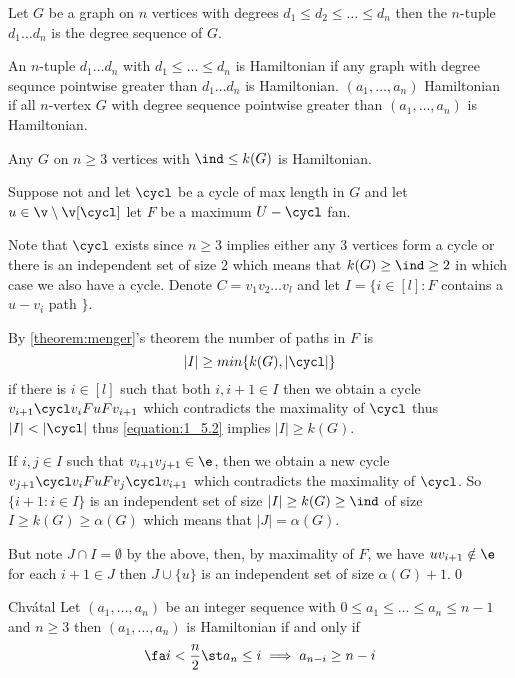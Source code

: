\begin{definition}
    Let $G$ be a graph on $n$ vertices with degrees $d_1 \leq d_2 \leq \dots \leq d_n$ then the $n$-tuple $d_1 \dots d_n$ is the degree sequence of $G$.
\end{definition}
An $n$-tuple $d_1 \dots d_n$ with $d_1 \leq \dots \leq d_n$ is Hamiltonian if any graph with degree sequnce pointwise greater than $d_1 \dots d_n$ is Hamiltonian. $(a_1, \dots, a_n)$ Hamiltonian if all $n$-vertex $G$ with degree sequence pointwise greater than $(a_1, \dots, a_n)$ is Hamiltonian.
\begin{customproposition}{5.2}
\label{proposition:5.2}
    Any $G$ on $n \geq 3$ vertices with $\ind \leq k(G)$ is Hamiltonian.
\end{customproposition}
\begin{prf}
    Suppose not and let $\cycl$ be a cycle of max length in $G$ and let $u \in \v \setminus \v[\cycl]$ let $F$ be a maximum $U - \cycl$ fan.

    Note that $\cycl$ exists since $n \geq 3$ implies either any $3$ vertices form a cycle or there is an independent set of size $2$ which means that $k(G) \geq \ind \geq 2$ in which case we also have a cycle. Denote $C = v_1v_2 \dots v_l$ and let $I = \{i \in [l]: F$ contains a $u-v_i$ path $\}$.

    By \ref{theorem:menger}'s theorem the number of paths in $F$ is
    \begin{equation}
        \label{equation:1_5.2}
        |I| \geq min\{k(G), |\cycl|\}
    \end{equation}
    if there is $i \in [l]$ such that both $i, i + 1 \in I$ then we obtain a cycle $v_{i + 1} \cycl v_i F u F v_{i + 1}$ which contradicts the maximality of $\cycl$ thus $|I| < |\cycl|$ thus \ref{equation:1_5.2} implies $|I| \geq k(G)$.

    If $i, j \in I$ such that $v_{i + 1}v_{j + 1} \in \e$, then we obtain a new cycle $v_{j + 1} \cycl v_i F u F v_j \cycl v_{i + 1}$ which contradicts the maximality of $\cycl$. So $\{i + 1: i \in I\}$ is an independent set of size $|I| \geq k(G) \geq \ind$ of size $I \geq k(G) \geq \alpha(G)$ which means that $|J| = \alpha(G)$.

    But note $J \cap I = \emptyset$ by the above, then, by maximality of $F$, we have $uv_{i + 1} \notin \e$ for each $i + 1 \in J$ then $J \cup \{u\}$ is an independent set of size $\alpha(G) + 1$.\qed
\end{prf}
\begin{customtheorem}{Chvátal}
\label{theorem:chvatal}
    Let $(a_1, \dots, a_n)$ be an integer sequence with $0 \leq a_1 \leq \dots \leq a_n \leq n - 1$ and $n \geq 3$ then $(a_1, \dots, a_n)$ is Hamiltonian if and only if
    \begin{equation}
        \label{equation:1_chvatal}
        \fa i < \frac{n}{2} \st a_n \leq i \implies a_{n - i} \geq n - i
    \end{equation}
\end{customtheorem}
